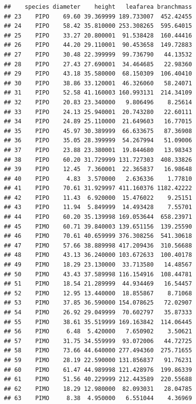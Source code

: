 \documentclass[]{book}
\newenvironment{Shaded}{\begin{snugshade}}{\end{snugshade}}
\newcommand{\CommentTok}[1]{\textcolor[rgb]{0.56,0.35,0.01}{\textit{#1}}}
\newcommand{\DecValTok}[1]{\textcolor[rgb]{0.00,0.00,0.81}{#1}}
\newcommand{\NormalTok}[1]{#1}
\newcommand{\OperatorTok}[1]{\textcolor[rgb]{0.81,0.36,0.00}{\textbf{#1}}}
\newcommand{\StringTok}[1]{\textcolor[rgb]{0.31,0.60,0.02}{#1}}
\begin{document}
\begin{verbatim}
##    species diameter    height   leafarea branchmass
## 23    PIPO    69.60 39.369999 189.733007  452.42455
## 24    PIPO    58.42 35.810000 253.308265  595.64015
## 25    PIPO    33.27 20.800001  91.538428  160.44416
## 26    PIPO    44.20 29.110001  90.453658  149.72883
## 27    PIPO    30.48 22.399999  99.736790   44.13532
## 28    PIPO    27.43 27.690001  34.464685   22.98360
## 29    PIPO    43.18 35.580000  68.150309  106.40410
## 30    PIPO    38.86 33.120001  46.326060   58.24071
## 31    PIPO    52.58 41.160003 160.993131  214.34109
## 32    PIPO    20.83 23.340000   9.806496    8.25614
## 33    PIPO    24.13 25.940001  20.743280   22.60111
## 34    PIPO    24.89 25.110000  21.649603   16.77015
## 35    PIPO    45.97 30.389999  66.633675   87.36908
## 36    PIPO    35.05 28.399999  54.267994   51.09006
## 37    PIPO    23.88 23.380001  19.844680   13.98343
## 38    PIPO    60.20 31.729999 131.727303  408.33826
## 39    PIPO    12.45  7.360001  22.365837   16.98648
## 40    PIPO     4.83  3.570000   2.636336    1.77810
## 41    PIPO    70.61 31.929997 411.160376 1182.42222
## 42    PIPO    11.43  6.920000  15.476022    9.25151
## 43    PIPO    11.94  5.849999  14.493428    7.55701
## 44    PIPO    60.20 35.139998 169.053644  658.23971
## 45    PIMO    60.71 39.840003 139.651156  139.25590
## 46    PIMO    70.61 40.659999 376.308256  541.30618
## 47    PIMO    57.66 38.889998 417.209436  310.56688
## 48    PIMO    43.13 36.240000 103.672633  100.40178
## 49    PIMO    18.29 23.130000  33.713580   14.48567
## 50    PIMO    43.43 37.589998 116.154916  108.44781
## 51    PIMO    18.54 21.289999  44.934469   16.54457
## 52    PIMO    12.95 13.440000  18.855867    8.71068
## 53    PIMO    37.85 36.590000 154.078625   72.02907
## 54    PIMO    26.92 29.049999  70.602797   35.87333
## 55    PIMO    38.61 35.519999 169.163842  114.06445
## 56    PIMO     6.48  5.420000   7.650902    3.50621
## 57    PIMO    31.75 34.559999  93.072006   44.72725
## 58    PIMO    73.66 44.640000 277.494360  275.71655
## 59    PIMO    28.19 22.590000 131.856837   91.76231
## 60    PIMO    61.47 44.989998 121.428976  199.86339
## 61    PIMO    51.56 40.229999 212.443589  220.55688
## 62    PIMO    18.29 12.980000  82.093031   28.04785
## 63    PIMO     8.38  4.950000   6.551044    4.36969
\end{verbatim}

\begin{Shaded}
\end{Shaded}
\end{document}
